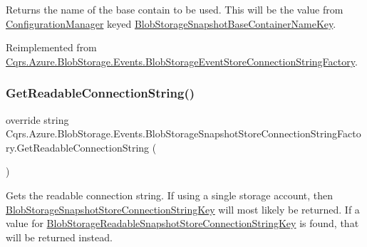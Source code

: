 Returns the name of the base contain to be used. This will be the value from \hyperlink{namespaceCqrs_1_1Azure_1_1ConfigurationManager}{Configuration\+Manager} keyed \hyperlink{classCqrs_1_1Azure_1_1BlobStorage_1_1Events_1_1BlobStorageSnapshotStoreConnectionStringFactory_a9777a326f415cc28d4b14133da4347da_a9777a326f415cc28d4b14133da4347da}{Blob\+Storage\+Snapshot\+Base\+Container\+Name\+Key}. 



Reimplemented from \hyperlink{classCqrs_1_1Azure_1_1BlobStorage_1_1Events_1_1BlobStorageEventStoreConnectionStringFactory_a0e6aadced9c9a583884899a4c9de2f1a_a0e6aadced9c9a583884899a4c9de2f1a}{Cqrs.\+Azure.\+Blob\+Storage.\+Events.\+Blob\+Storage\+Event\+Store\+Connection\+String\+Factory}.

\mbox{\label{classCqrs_1_1Azure_1_1BlobStorage_1_1Events_1_1BlobStorageSnapshotStoreConnectionStringFactory_ab226acce237117b81f7ea577b2190697_ab226acce237117b81f7ea577b2190697}} 
\subsubsection{\texorpdfstring{Get\+Readable\+Connection\+String()}{GetReadableConnectionString()}}
{\footnotesize\ttfamily override string Cqrs.\+Azure.\+Blob\+Storage.\+Events.\+Blob\+Storage\+Snapshot\+Store\+Connection\+String\+Factory.\+Get\+Readable\+Connection\+String (\begin{DoxyParamCaption}{ }\end{DoxyParamCaption})\hspace{0.3cm}{\ttfamily [virtual]}}



Gets the readable connection string. If using a single storage account, then \hyperlink{classCqrs_1_1Azure_1_1BlobStorage_1_1Events_1_1BlobStorageSnapshotStoreConnectionStringFactory_a9638ce6d0077def1e742b688e4581874_a9638ce6d0077def1e742b688e4581874}{Blob\+Storage\+Snapshot\+Store\+Connection\+String\+Key} will most likely be returned. If a value for \hyperlink{classCqrs_1_1Azure_1_1BlobStorage_1_1Events_1_1BlobStorageSnapshotStoreConnectionStringFactory_af194b50ec2e3de65c0207776491777d3_af194b50ec2e3de65c0207776491777d3}{Blob\+Storage\+Readable\+Snapshot\+Store\+Connection\+String\+Key} is found, that will be returned instead. 



